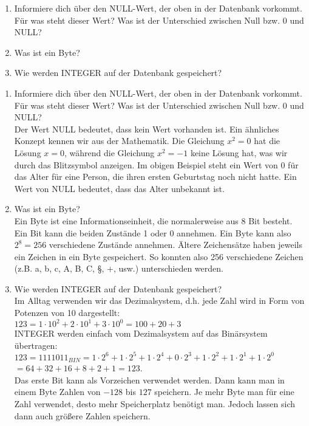 \begin{Exercise}[title={Beantworte folgende Fragen; Du kannst das Internet zu Rate ziehen.}, label=Datentypen]
	\begin{enumerate}
		\item Informiere dich über den NULL-Wert, der oben in der Datenbank vorkommt. Für was steht dieser Wert? Was ist der Unterschied zwischen Null bzw. 0 und NULL?
		\item Was ist ein Byte?
		\item Wie werden INTEGER auf der Datenbank gespeichert?
	\end{enumerate}
\end{Exercise}
\begin{Answer}[ref=Datentypen]
	\begin{enumerate}
		\item Informiere dich über den NULL-Wert, der oben in der Datenbank vorkommt. Für was steht dieser Wert? Was ist der Unterschied zwischen Null bzw. 0 und NULL?\\
		Der Wert NULL bedeutet, dass kein Wert vorhanden ist. Ein ähnliches Konzept kennen wir aus der Mathematik. Die Gleichung \(x^2=0\) hat die Lösung \(x=0\), während die Gleichung \(x^2=-1\) keine Lösung hat, was wir durch das Blitzsymbol \Lightning\normalsize anzeigen. Im obigen Beispiel steht ein Wert von 0 für das Alter für eine Person, die ihren ersten Geburtstag noch nicht hatte. Ein Wert von NULL bedeutet, dass das Alter unbekannt ist.
		\item Was ist ein Byte?\\
		Ein Byte ist eine Informationseinheit, die normalerweise aus 8 Bit besteht. Ein Bit kann die beiden Zustände 1 oder 0 annehmen. Ein Byte kann also \(2^8=256\) verschiedene Zustände annehmen. Ältere Zeichensätze haben jeweils ein Zeichen in ein Byte gespeichert. So konnten also 256 verschiedene Zeichen (z.B. a, b, c, A, B, C, §, +, usw.) unterschieden werden.
		\item Wie werden INTEGER auf der Datenbank gespeichert?\\
		Im Alltag verwenden wir das Dezimalsystem, d.h. jede Zahl wird in Form von Potenzen von 10 dargestellt:\\
		\(123=1\cdot10^2+2\cdot 10^1+3\cdot 10^0=100+20+3\)\\
		INTEGER werden einfach vom Dezimalsystem auf das Binärsystem übertragen:\\
		\(123=1111011_{BIN}=1\cdot2^6+1\cdot2^5+1\cdot2^4+0\cdot2^3+1\cdot2^2+1\cdot2^1+1\cdot2^0\)\\
		\(=64+32+16+8+2+1=123\).\\
		Das erste Bit kann als Vorzeichen verwendet werden. Dann kann man in einem Byte Zahlen von \(-128\) bis \(127\) speichern. Je mehr Byte man für eine Zahl verwendet, desto mehr Speicherplatz benötigt man. Jedoch lassen sich dann auch größere Zahlen speichern.
	\end{enumerate}
\end{Answer}